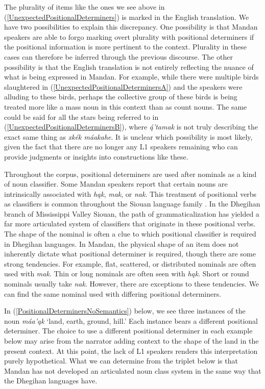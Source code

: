 The plurality of items like the ones we see above in (\ref{UnexpectedPositionalDeterminers}) is marked in the English translation. We have two possibilities to explain this discrepancy. One possibility is that Mandan speakers are able to forgo marking overt plurality with positional determiners if the positional information is more pertinent to the context. Plurality in these cases can therefore be inferred through the previous discourse. The other possibility is that the English translation is not entirely reflecting the nuance of what is being expressed in Mandan. For example, while there were multiple birds slaughtered in (\ref{UnexpectedPositionalDeterminersA}) and the speakers were alluding to these birds, perhaps the collective group of these birds is being treated more like a mass noun in this context than as count nouns. The same could be said for all the stars being referred to in (\ref{UnexpectedPositionalDeterminersB}), where \textit{ą́'tamak} is not truly describing the exact same thing as \textit{xkék máakahe}. It is unclear which possibility is most likely, given the fact that there are no longer any L1 speakers remaining who can provide judgments or insights into constructions like these.

Throughout the corpus, positional determiners are used after nominals as a kind of noun classifier. Some Mandan speakers report that certain nouns are intrinsically associated with \textit{hąk}, \textit{mak}, or \textit{nak}. This treatment of positional verbs as classifiers is common throughout the Siouan language family \citep[205]{rankin2004}. In the Dhegihan branch of Mississippi Valley Siouan, the path of grammaticalization has yielded a far more articulated system of classifiers that originate in these positional verbs. The shape of the nominal is often a clue to which positional classifier is required in Dhegihan languages. In Mandan, the physical shape of an item does not inherently dictate what positional determiner is required, though there are some strong tendencies. For example, flat, scattered, or distributed nominals are often used with \textit{mak}.
Thin or long nominals are often seen with \textit{hąk}. Short or round nominals usually take \textit{nak}. However, there are exceptions to these tendencies. We can find the same nominal used with differing positional determiners.

In (\ref{PositionalDeterminersNoSemantics}) below, we see three instances of the noun \textit{máa'ąk} `land, earth, ground, hill.' Each instance bears a different positional determiner. The choice to use a different positional determiner in each example below may arise from the narrator adding context to the shape of the land in the present context. At this point, the lack of L1 speakers renders this interpretation purely hypothetical. What we can determine from the triplet below is that Mandan has not developed an articulated noun class system in the same way that the Dhegihan languages have.  

